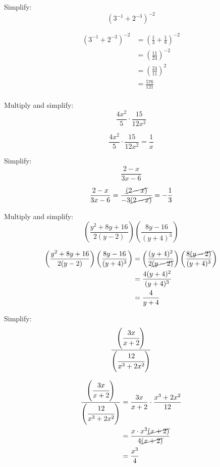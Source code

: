 \documentclass[fleqn,addpoints]{exam}
\begin{document}
\begin{questions}
\begin{solution}
\end{solution}

\question
Simplify:
\[
  (3^{-1} + 2^{-3})^{-2}
\]

\begin{solution}
\begin{align*}
  (3^{-1} + 2^{-3})^{-2} &= \left( \frac{1}{3} + \frac{1}{8} \right)^{-2} \\
   &= \left( \frac{11}{24} \right)^{-2} \\
   &= \left( \frac{24}{11} \right)^{2} \\
   &= \frac{576}{121} \\
\end{align*}

\end{solution}

\question
Multiply and simplify:
\[
  \frac{4x^2}{5} \cdot \frac{15}{12x^2}
\]

\begin{solution}
\[
  \frac{4x^2}{5} \cdot \frac{15}{12x^2} = \frac{1}{x}
\]
\end{solution}

\question
Simplify:
\[
  \frac{2-x}{3x-6}
\]

\begin{solution}
\[
  \frac{2-x}{3x-6} = \frac{\cancel{(2-x)}} {-3 \cancel{(2-x)}} = - \frac{1}{3}
\]
\end{solution}

\question
Multiply and simplify:
\[
  \left( \frac{y^2 + 8y + 16}{2(y-2)} \right) \left( \frac{8y-16}{(y+4)^3} \right)
\]

\begin{solution}
  
\begin{align*}
  \left( \frac{y^2 + 8y + 16}{2(y-2)} \right) \left( \frac{8y-16}{(y+4)^3} \right)
  &= \left( \frac{(y+4)^2}{2 \cancel{(y-2)}} \right) \left( \frac{8 \cancel{(y-2)}} {(y+4)^3} \right) \\
  &= \frac{4(y+4)^2}{(y+4)^3} \\
  &= \frac{4}{y+4} \\
\end{align*}

\end{solution}

\question
Simplify:
\[
  \frac{\left( \cfrac{3x}{x+2} \right)}{\left( \cfrac{12}{x^3 + 2x^2} \right)}
\]

\begin{solution}
\begin{align*}
  \frac{\left( \cfrac{3x}{x+2} \right)}{\left( \cfrac{12}{x^3 + 2x^2} \right)}
  &= \frac{3x}{x+2} \cdot \frac{x^3 + 2x^2}{12} \\
  &= \frac{x \cdot x^2 \cancel{(x+2)} }{4 \cancel{(x+2)}} \\
  &= \frac{x^3}{4} \\
\end{align*}
\end{solution}


\end{questions}
\end{document}
